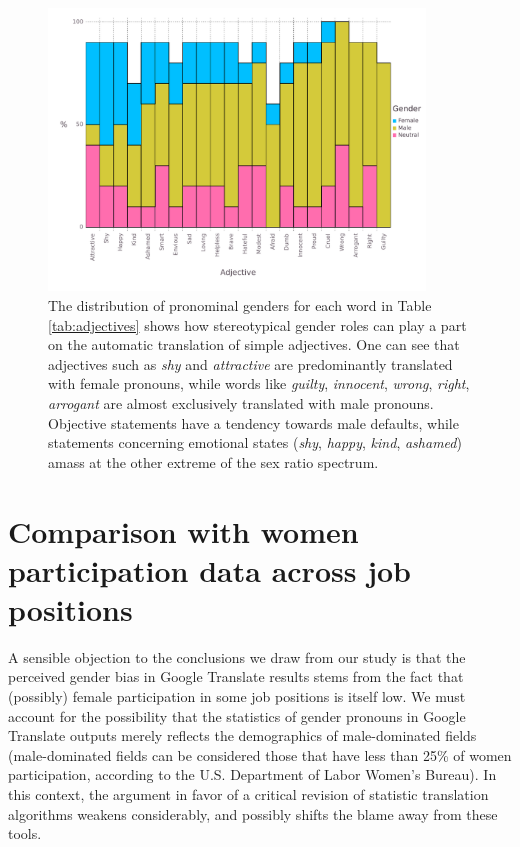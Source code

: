\documentclass[fleqn,10pt]{article}
\begin{document}
\begin{figure}[H]
	\centering
	\includegraphics[width=10cm]{pictures/barplot-adjectives}
	\caption{The distribution of pronominal genders for each word in Table \ref{tab:adjectives} shows how stereotypical gender roles can play a part on the automatic translation of simple adjectives. One can see that adjectives such as \emph{shy} and \emph{attractive} are predominantly translated with female pronouns, while words like \emph{guilty}, \emph{innocent}, \emph{wrong}, \emph{right}, \emph{arrogant} are almost exclusively translated with male pronouns. Objective statements have a tendency towards male defaults, while statements concerning emotional states (\emph{shy}, \emph{happy}, \emph{kind}, \emph{ashamed}) amass at the other extreme of the sex ratio spectrum.}
	\label{fig:barplot-adjectives}
\end{figure}

\section{Comparison with women participation data across job positions}\label{sec:comparison-women-participation}

A sensible objection to the conclusions we draw from our study is that the perceived gender bias in Google Translate results stems from the fact that (possibly) female participation in some job positions is itself low. We must account for the possibility that the statistics of gender pronouns in Google Translate outputs merely reflects the demographics of male-dominated fields (male-dominated fields can be considered those that have less than 25\% of women participation\citep{WB2014}, according to the U.S. Department of Labor Women's Bureau). In this context, the argument in favor of a critical revision of statistic translation algorithms weakens considerably, and possibly shifts the blame away from these tools.
\end{document}
